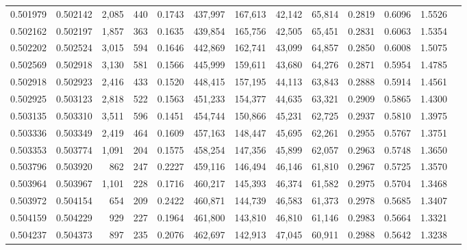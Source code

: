 \begin{tabular}{rrrrrrrrrrrrr}
0.501979 & 0.502142 &  2,085 &   440 &                                     0.1743 & 437,997 & 167,613 &  42,142 &  65,814 & 0.2819 & 0.6096 & 1.5526 \\
0.502162 & 0.502197 &  1,857 &   363 &                                     0.1635 & 439,854 & 165,756 &  42,505 &  65,451 & 0.2831 & 0.6063 & 1.5354 \\
0.502202 & 0.502524 &  3,015 &   594 &                                     0.1646 & 442,869 & 162,741 &  43,099 &  64,857 & 0.2850 & 0.6008 & 1.5075 \\
0.502569 & 0.502918 &  3,130 &   581 &                                     0.1566 & 445,999 & 159,611 &  43,680 &  64,276 & 0.2871 & 0.5954 & 1.4785 \\
0.502918 & 0.502923 &  2,416 &   433 &                                     0.1520 & 448,415 & 157,195 &  44,113 &  63,843 & 0.2888 & 0.5914 & 1.4561 \\
0.502925 & 0.503123 &  2,818 &   522 &                                     0.1563 & 451,233 & 154,377 &  44,635 &  63,321 & 0.2909 & 0.5865 & 1.4300 \\
0.503135 & 0.503310 &  3,511 &   596 &                                     0.1451 & 454,744 & 150,866 &  45,231 &  62,725 & 0.2937 & 0.5810 & 1.3975 \\
0.503336 & 0.503349 &  2,419 &   464 &                                     0.1609 & 457,163 & 148,447 &  45,695 &  62,261 & 0.2955 & 0.5767 & 1.3751 \\
0.503353 & 0.503774 &  1,091 &   204 &                                     0.1575 & 458,254 & 147,356 &  45,899 &  62,057 & 0.2963 & 0.5748 & 1.3650 \\
0.503796 & 0.503920 &    862 &   247 &                                     0.2227 & 459,116 & 146,494 &  46,146 &  61,810 & 0.2967 & 0.5725 & 1.3570 \\
0.503964 & 0.503967 &  1,101 &   228 &                                     0.1716 & 460,217 & 145,393 &  46,374 &  61,582 & 0.2975 & 0.5704 & 1.3468 \\
0.503972 & 0.504154 &    654 &   209 &                                     0.2422 & 460,871 & 144,739 &  46,583 &  61,373 & 0.2978 & 0.5685 & 1.3407 \\
0.504159 & 0.504229 &    929 &   227 &                                     0.1964 & 461,800 & 143,810 &  46,810 &  61,146 & 0.2983 & 0.5664 & 1.3321 \\
0.504237 & 0.504373 &    897 &   235 &                                     0.2076 & 462,697 & 142,913 &  47,045 &  60,911 & 0.2988 & 0.5642 & 1.3238 \\

\end{tabular}
